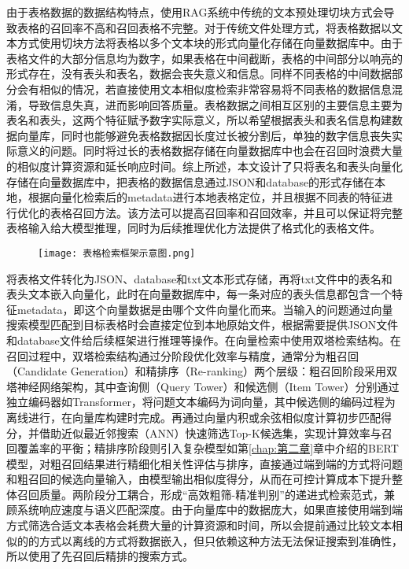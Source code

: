 由于表格数据的数据结构特点，使用RAG系统中传统的文本预处理切块方式会导致表格的召回率不高和召回表格不完整。对于传统文件处理方式，将表格数据以文本方式使用切块方法将表格以多个文本块的形式向量化存储在向量数据库中。由于表格文件的大部分信息均为数字，如果表格在中间截断，表格的中间部分以响亮的形式存在，没有表头和表名，数据会丧失意义和信息。同样不同表格的中间数据部分会有相似的情况，若直接使用文本相似度检索非常容易将不同表格的数据信息混淆，导致信息失真，进而影响回答质量。表格数据之间相互区别的主要信息主要为表名和表头，这两个特征赋予数字实际意义，所以希望根据表头和表名信息构建数据向量库，同时也能够避免表格数据因长度过长被分割后，单独的数字信息丧失实际意义的问题。同时将过长的表格数据存储在向量数据库中也会在召回时浪费大量的相似度计算资源和延长响应时间。综上所述，本文设计了只将表名和表头向量化存储在向量数据库中，把表格的数据信息通过JSON和database的形式存储在本地，根据向量化检索后的metadata进行本地表格定位，并且根据不同表的特征进行优化的表格召回方法。该方法可以提高召回率和召回效率，并且可以保证将完整表格输入给大模型推理，同时为后续推理优化方法提供了格式化的表格文件。
\begin{figure}[!htbp]
    \centering
    \texttt{[image: 表格检索框架示意图.png]}
    \label{fig:4-2}
\end{figure}
将表格文件转化为JSON、database和txt文本形式存储，再将txt文件中的表名和表头文本嵌入向量化，此时在向量数据库中，每一条对应的表头信息都包含一个特征metadata，即这个向量数据是由哪个文件向量化而来。当输入的问题通过向量搜索模型匹配到目标表格时会直接定位到本地原始文件，根据需要提供JSON文件和database文件给后续框架进行推理等操作。在向量检索中使用双塔检索结构\cite{bahdanauNeuralMachineTranslation2016,sutskeverSequenceSequenceLearning2014,radfordImprovingLanguageUnderstanding2018,fanHierarchicalNeuralStory2018,holtzmanCuriousCaseNeural2020}。在召回过程中，双塔检索结构通过分阶段优化效率与精度，通常分为粗召回（Candidate Generation）和精排序（Re-ranking）两个层级：粗召回阶段采用双塔神经网络架构，其中查询侧（Query Tower）和候选侧（Item Tower）分别通过独立编码器如Transformer，将问题文本编码为词向量，其中候选侧的编码过程为离线进行，在向量库构建时完成。再通过向量内积或余弦相似度计算初步匹配得分，并借助近似最近邻搜索（ANN）快速筛选Top-K候选集，实现计算效率与召回覆盖率的平衡；精排序阶段则引入复杂模型如第\ref{chap:第二章}章中介绍的BERT模型，对粗召回结果进行精细化相关性评估与排序，直接通过端到端的方式将问题和粗召回的候选向量输入，由模型输出相似度得分，从而在可控计算成本下提升整体召回质量。两阶段分工耦合，形成“高效粗筛-精准判别”的递进式检索范式，兼顾系统响应速度与语义匹配深度。由于向量库中的数据庞大，如果直接使用端到端方式筛选合适文本表格会耗费大量的计算资源和时间，所以会提前通过比较文本相似的的方式以离线的方式将数据嵌入，但只依赖这种方法无法保证搜索到准确性，所以使用了先召回后精排的搜索方式。
